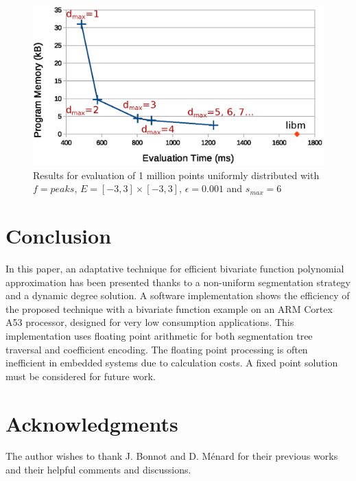 \documentclass[fleqn,10pt]{SelfArx} %
\begin{document}
\begin{figure}[h]
\centering
\includegraphics[width=\columnwidth]{graphics/results.eps}
\caption{Results for evaluation of 1 million points uniformly distributed with $f=peaks$, $E = [-3,3]\times[-3,3]$, $\epsilon = 0.001$ and $s_{max} = 6$}
\label{results}
\end{figure}


\section{Conclusion}
In this paper, an adaptative technique for efficient bivariate function polynomial approximation has been presented thanks to a non-uniform segmentation strategy and a dynamic degree solution. A software implementation shows the efficiency of the proposed technique with a bivariate function example on an ARM Cortex A53 processor, designed for very low consumption applications.
This implementation uses floating point arithmetic for both segmentation tree traversal and coefficient encoding. The floating point processing is often inefficient in embedded systems due to calculation costs. A fixed point solution must be considered for future work.

\section*{Acknowledgments} %
The author wishes to thank J. Bonnot and D. Ménard for their previous works and their helpful comments and discussions. 




\end{document}
